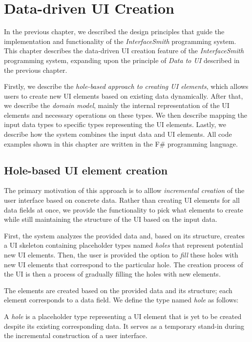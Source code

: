 \chapter{Data-driven UI Creation}
\label{chap:corelogic}

In the previous chapter, we described the design principles that guide the implementation and functionality of the \emph{InterfaceSmith} programming system.
This chapter describes the data-driven UI creation feature of the \emph{InterfaceSmith} programming system, expanding upon the principle of \emph{Data to UI} described in the previous chapter.

Firstly, we describe the \emph{hole-based approach to creating UI elements}, which allows users to create new UI elements based on existing data dynamically.
After that, we describe the \emph{domain model}, mainly the internal representation of the UI elements and necessary operations on these types.
We then describe mapping the input data types to specific types representing the UI elements.
Lastly, we describe how the system combines the input data and UI elements.
All code examples shown in this chapter are written in the F\#\cite{fsharp} programming language.

\section{Hole-based UI element creation}
\label{sec:hole-based}
The primary motivation of this approach is to alllow \emph{incremental creation} of the user interface based on concrete data.
Rather than creating UI elements for all data fields at once, we provide the functionality to pick what elements to create while still maintaining the structure of the UI based on the input data.

First, the system analyzes the provided data and, based on its structure, creates a UI skeleton containing placeholder types named \emph{holes} that represent potential new UI elements.
Then, the user is provided the option to \emph{fill} these holes with new UI elements that correspond to the particular hole.
The creation process of the UI is then a process of gradually filling the holes with new elements.

The elements are created based on the provided data and its structure; each element corresponds to a data field.
We define the type named \emph{hole} as follows:
\begin{defn}
	A \emph{hole} is a placeholder type representing a UI element that is yet to be created despite its existing corresponding data.
	It serves as a temporary stand-in during the incremental construction of a user interface.
\end{defn}

